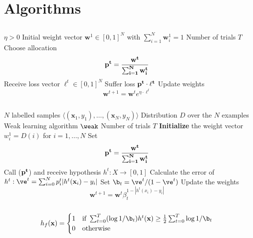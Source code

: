 
\chapter{Algorithms}
\label{app:algo}

\section{\hedge}
\label{app:hedge}

\begin{algorithm}
\caption{\hedge}
\begin{algorithmic}[1]
\Require 
\Statex $\eta>0$
\Statex Initial weight vector $\mathbf{w}^1\in [0,1]^N$ with $\sum_{i=1}^N \mathbf{w}^1_i=1$
\Statex Number of trials $T$
\State Choose allocation $$\bf p^t= \frac{\bf w^t}{\sum_{i=1}^N w^t_i}$$
\State Receive loss vector $\ell^t\in[0,1]^N$
\State Suffer loss $\bf p^t\cdot \ell^t$
\State Update weights $$\mathbf{w}^{t+1}=\mathbf{w}^te^{\eta\cdot\ell^{t}}$$
\EndFor
\EndProcedure
\end{algorithmic}
\end{algorithm}
\newpage
\section{\adaB}
\label{app:adaB}

\begin{algorithm} 
\caption{\adaB}
\begin{algorithmic}[1]
\Require 
\Statex $N$ labelled samples $\langle (\mathbf x_1,y_1),\ldots,(\mathbf x_N,y_N)\rangle$
\Statex Distribution $D$ over the $N$ examples
\Statex Weak learning algorithm $\weak$
\Statex Number of trials $T$
\State \textbf{Initialize} the weight vector $w_i^1=D(i)$ for $i=1,\ldots,N$
\State Set $$\bf p^t= \frac{\bf w^t}{\sum_{i=1}^N w^t_i}$$
\State Call \weak($\bf p^t$) and receive hypothesis $h^t:X\to [0,1]$
\State Calculate the error of $h^t:\ve^t=\sum^N_{i=0}p^t_i|h^t(\mathbf x_i)-y_i|$
\State Set $\b_t=\ve^t/(1-\ve^t)$
\State Update the weights $$\mathbf{w}^{t+1}=\mathbf{w}^t\beta^{1-|h^t(x_i)-y_i|}_t$$
\EndFor\\
\Return $$h_f(\mathbf x)=\begin{cases}1 & \text{if } \sum^T_{t=0}(\log1/\b_t)h^t(\mathbf x)\geq\frac12\sum^T_{t=0}\log1/\b_t\\0&\text{otherwise}\end{cases}$$
\EndProcedure
\end{algorithmic}
\end{algorithm}

